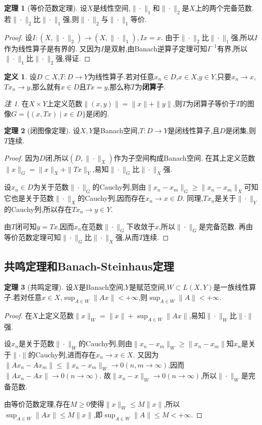 \documentclass{ctexart}
\theoremstyle{definition}
\newtheorem{definition}{定义}
\newtheorem{theorem}{定理}
\theoremstyle{remark}
\newtheorem*{remark}{注}
\begin{document}
	\begin{theorem}[等价范数定理]
		设$X$是线性空间,$\|\cdot\|_1$和$\|\cdot\|_2$是$X$上的两个完备范数.若$\|\cdot\|_2$比$\|\cdot\|_1$强,则$\|\cdot\|_2$与$\|\cdot\|_1$等价.
	\end{theorem}
	\begin{proof}
		设$I:(X,\|\cdot\|_2)\to(X,\|\cdot\|_1),Ix=x$.
		由于$\|\cdot\|_2$比$\|\cdot\|_1$强,所以$I$作为线性算子是有界的.
		又因为$I$是双射,由Banach逆算子定理可知$I^{-1}$有界,所以$\|\cdot\|_1$比$\|\cdot\|_2$强,得证.
	\end{proof}
	
	\begin{definition}
		设$D\subset X$,$T:D\to Y$为线性算子.若对任意$x_n\in D$,$x\in X$,$y\in Y$,只要$x_n\to x$,$Tx_n\to y$,那么就有$x\in D$且$Tx=y$,那么称$T$为\textbf{闭算子}.
	\end{definition}
	\begin{remark}
		在$X\times Y$上定义范数$\|(x,y)\|=\|x\|+\|y\|$,则$T$为闭算子等价于$T$的图像$G=\{(x,Tx)\mid x\in D\}$是闭的.
	\end{remark}
	\begin{theorem}[闭图像定理]
		设$X,Y$是Banach空间,$T:D\to Y$是闭线性算子,且$D$是闭集,则$T$连续.
	\end{theorem}
	\begin{proof}
		因为$D$闭,所以$(D,\|\cdot\|_X)$作为子空间构成Banach空间.
		在其上定义范数$\|x\|_G=\|x\|_X+\|Tx\|_Y$,易知$\|\cdot\|_G$比$\|\cdot\|_X$强.
		
		设$x_n\in D$为关于范数$\|\cdot\|_G$的Cauchy列,则由$\|x_n-x_m\|_G\ge\|x_n-x_m\|_X$可知它也是关于范数$\|\cdot\|_X$的Cauchy列,因而存在$x_n\to x\in D$.
		同理,$Tx_n$是关于$\|\cdot\|_Y$的Cauchy列,所以存在$Tx_n\to y\in Y$.
		
		由$T$闭可知$y=Tx$,因而$x_n$在范数$\|\cdot\|_G$下收敛于$x$,所以$\|\cdot\|_G$是完备范数.
		再由等价范数定理可知$\|\cdot\|_G$比$\|\cdot\|_X$强,从而$T$连续.
	\end{proof}
	
	\subsection{共鸣定理和Banach-Steinhaus定理}
	
	\begin{theorem}[共鸣定理]
		设$X$是Banach空间,$Y$是赋范空间,$W\subset L(X,Y)$是一族线性算子.若对任意$x\in X$,$\sup_{A\in W}{\|Ax\|}<+\infty$,则$\sup_{A\in W}{\|A\|}<+\infty$.
	\end{theorem}
	\begin{proof}
		在$X$上定义范数$\|x\|_W=\|x\|+\sup_{A\in W}{\|Ax\|}$,易知$\|\cdot\|_W$比$\|\cdot\|$强.
		
		设$x_n$是关于范数$\|\cdot\|_W$的Cauchy列,则由$\|x_n-x_m\|_W\ge\|x_n-x_m\|$知$x_n$是关于$\|\cdot\|$的Cauchy列,进而存在$x_n\to x\in X$.
		又因为$\|Ax_n-Ax_m\|\le\|x_n-x_m\|_W\to 0(n,m\to\infty)$,因而$\|Ax_n-Ax\|\to 0(n\to\infty)$.
		故$\|x_n-x\|_W\to 0(n\to\infty)$,所以$\|\cdot\|_W$是完备范数.
		
		由等价范数定理,存在$M\ge 0$使得$\|x\|_W\le M\|x\|$,所以$\sup_{A\in W}{\|Ax\|}\le M\|x\|$,即$\sup_{A\in W}{\|A\|}\le M<+\infty$.
	\end{proof}
	
\end{document}
